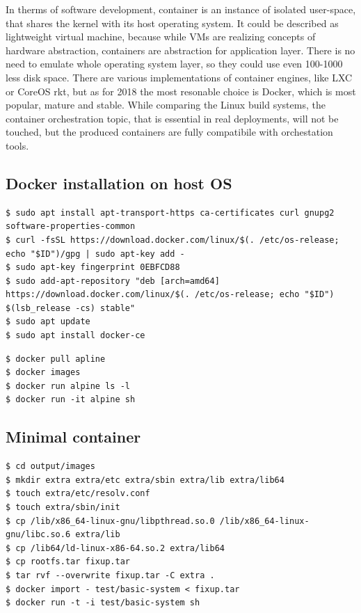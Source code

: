 \documentclass[printmode]{mgr}
\begin{document}

In therms of software development, container is an instance of isolated user-space, that shares the kernel with its host operating system.\cite{web:what-container}
It could be described as lightweight virtual machine, because while VMs are realizing concepts of hardware abstraction, containers are abstraction for application layer.
There is no need to emulate whole operating system layer, so they could use even 100-1000 less disk space.
There are various implementations of container engines, like LXC or CoreOS rkt, but as for 2018 the most resonable choice is Docker, which is most popular, mature and stable.\cite{web:why-docker}
While comparing the Linux build systems, the container orchestration topic, that is essential in real deployments\cite{web:container-orchestration}, will not be touched, but the produced containers are fully compatibile with orchestation tools.

\subsection*{Docker installation on host OS}

\begin{lstlisting}
$ sudo apt install apt-transport-https ca-certificates curl gnupg2 software-properties-common
$ curl -fsSL https://download.docker.com/linux/$(. /etc/os-release; echo "$ID")/gpg | sudo apt-key add -
$ sudo apt-key fingerprint 0EBFCD88
$ sudo add-apt-repository "deb [arch=amd64] https://download.docker.com/linux/$(. /etc/os-release; echo "$ID") $(lsb_release -cs) stable"
$ sudo apt update
$ sudo apt install docker-ce
\end{lstlisting}


\begin{lstlisting}
$ docker pull apline
$ docker images
$ docker run alpine ls -l
$ docker run -it alpine sh
\end{lstlisting}

\subsection*{Minimal container}

\begin{lstlisting}
$ cd output/images
$ mkdir extra extra/etc extra/sbin extra/lib extra/lib64
$ touch extra/etc/resolv.conf
$ touch extra/sbin/init
$ cp /lib/x86_64-linux-gnu/libpthread.so.0 /lib/x86_64-linux-gnu/libc.so.6 extra/lib
$ cp /lib64/ld-linux-x86-64.so.2 extra/lib64
$ cp rootfs.tar fixup.tar
$ tar rvf --overwrite fixup.tar -C extra .
$ docker import - test/basic-system < fixup.tar
$ docker run -t -i test/basic-system sh
\end{lstlisting}
\end{document}
